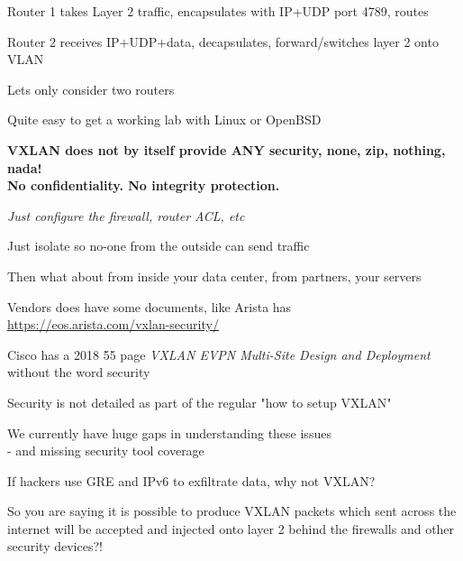 \documentclass[Screen16to9,17pt,footrule]{foils}
\begin{document}
\begin{list2}
\item Router 1 takes Layer 2 traffic, encapsulates with IP+UDP port 4789, routes
\item Router 2 receives IP+UDP+data, decapsulates, forward/switches layer 2 onto VLAN
\item Lets only consider two routers
\end{list2}

\centerline{Quite easy to get a working lab with Linux or OpenBSD \smiley}


{\bf VXLAN does not by itself provide ANY security, none, zip, nothing, nada! \\
No confidentiality. No integrity protection.}



\begin{list2}
\item \emph{Just configure the firewall, router ACL, etc}
\item Just isolate so no-one from the outside can send traffic
\item Then what about from inside your data center, from partners, your servers
\item Vendors does have some documents, like Arista has\\ \url{https://eos.arista.com/vxlan-security/}
\item Cisco has a 2018 55 page \emph{VXLAN EVPN Multi-Site
Design and Deployment} \\
without the word security
\item Security is not detailed as part of the regular "how to setup VXLAN"
\end{list2}


\vskip 1cm
We currently have huge gaps in understanding these issues\\
- and missing security tool coverage

\vskip 5mm

{\small If hackers use GRE and IPv6 to exfiltrate data, why not VXLAN?}


\vskip 2cm
So you are saying it is possible to produce VXLAN packets which sent across the internet will be accepted and injected onto layer 2 behind the firewalls and other security devices?!
\end{document}
